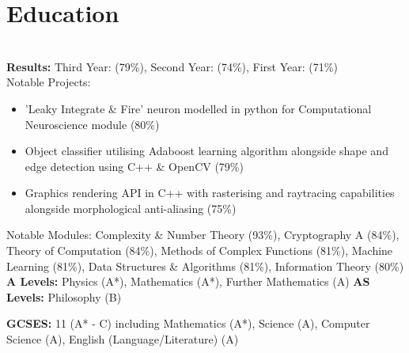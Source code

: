 \documentclass{cvclass}
\begin{document}
\titlespacing*{\subsection}{0pt}{4pt}{2pt}
\address{Email: sollyvarcoe@gmail.com, Mobile: 07908911995}
\address{Github: www.github.com/sollyvarcoe}
\section{\textbf{Education}}
\\

\textbf{Results:} Third Year: (79\%),   Second Year: (74\%),  First Year: (71\%)\\

\noindent Notable Projects:
\begin{itemize}
 \itemsep0em 
  \item 'Leaky Integrate \& Fire' neuron modelled in python for Computational Neuroscience module (80\%)
\item Object classifier utilising Adaboost learning algorithm alongside shape and edge detection using C++ \& OpenCV (79\%)
  \item Graphics rendering API in C++ with rasterising and raytracing capabilities alongside morphological anti-aliasing (75\%)
\end{itemize}
Notable Modules: Complexity \& Number Theory (93\%), Cryptography A (84\%), Theory of Computation (84\%), Methods of Complex Functions (81\%), Machine Learning (81\%), Data Structures \& Algorithms (81\%), Information Theory (80\%)
\textbf{A Levels:} Physics (A*), Mathematics (A*), Further Mathematics (A) \textbf{AS Levels:} Philosophy (B)

\textbf{GCSES:} 11 (A* - C) including Mathematics (A*), Science (A), Computer Science (A), English (Language/Literature) (A)
\end{document}
